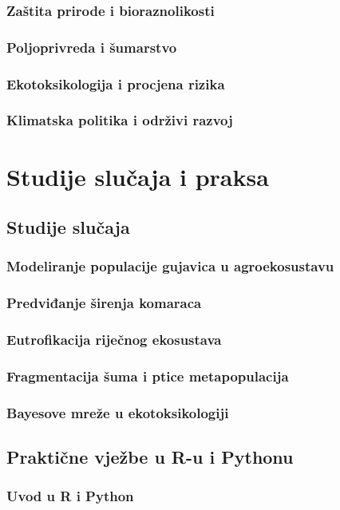 \documentclass[12pt,a4paper]{book}
\begin{document}
	\section{Zaštita prirode i bioraznolikosti}
	\section{Poljoprivreda i šumarstvo}
	\section{Ekotoksikologija i procjena rizika}
	\section{Klimatska politika i održivi razvoj}
	
	\part{Studije slučaja i praksa}
	\chapter{Studije slučaja}
	\section{Modeliranje populacije gujavica u agroekosustavu}
	\section{Predviđanje širenja komaraca}
	\section{Eutrofikacija riječnog ekosustava}
	\section{Fragmentacija šuma i ptice metapopulacija}
	\section{Bayesove mreže u ekotoksikologiji}
	
	\chapter{Praktične vježbe u R-u i Pythonu}
	\section{Uvod u R i Python}
\end{document}
